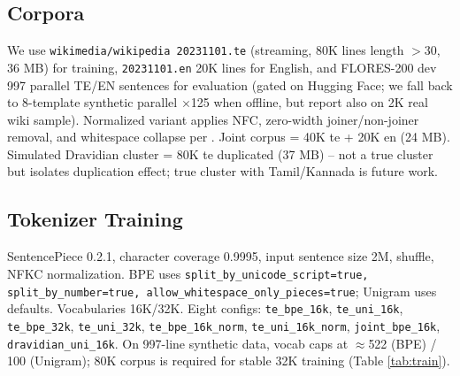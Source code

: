 \documentclass[conference]{IEEEtran}
\begin{document}
\subsection{Corpora}
We use \texttt{wikimedia/wikipedia 20231101.te} (streaming, 80K lines length $>$30, 36 MB) for training, \texttt{20231101.en} 20K lines for English, and FLORES-200 dev 997 parallel TE/EN sentences for evaluation (gated on Hugging Face; we fall back to 8-template synthetic parallel $\times$125 when offline, but report also on 2K real wiki sample). Normalized variant applies NFC, zero-width joiner/non-joiner removal, and whitespace collapse per \cite{brahma2026indic}. Joint corpus = 40K te + 20K en (24 MB). Simulated Dravidian cluster = 80K te duplicated (37 MB) -- not a true cluster but isolates duplication effect; true cluster with Tamil/Kannada is future work.

\subsection{Tokenizer Training}
SentencePiece 0.2.1, character coverage 0.9995, input sentence size 2M, shuffle, NFKC normalization. BPE uses \texttt{split\_by\_unicode\_script=true, split\_by\_number=true, allow\_whitespace\_only\_pieces=true}; Unigram uses defaults. Vocabularies 16K/32K. Eight configs: \texttt{te\_bpe\_16k}, \texttt{te\_uni\_16k}, \texttt{te\_bpe\_32k}, \texttt{te\_uni\_32k}, \texttt{te\_bpe\_16k\_norm}, \texttt{te\_uni\_16k\_norm}, \texttt{joint\_bpe\_16k}, \texttt{dravidian\_uni\_16k}. On 997-line synthetic data, vocab caps at $\approx$522 (BPE) / 100 (Unigram); 80K corpus is required for stable 32K training (Table \ref{tab:train}).

\begin{table}[t]
\centering
\footnotesize
\setlength{\tabcolsep}{3pt}
\caption{Training configurations. *Corpus size on disk; time on M1 Pro laptop.}
\label{tab:train}
\end{table}
\end{document}
